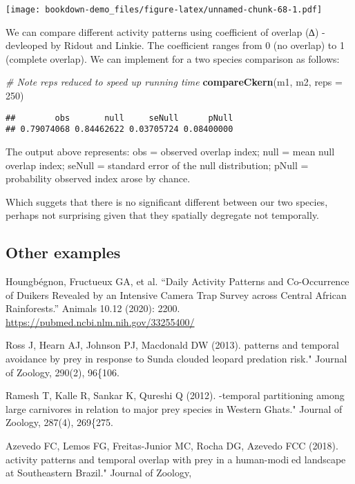\documentclass[]{book}
\newenvironment{Shaded}{\begin{snugshade}}{\end{snugshade}}
\newcommand{\KeywordTok}[1]{\textcolor[rgb]{0.13,0.29,0.53}{\textbf{#1}}}
\newcommand{\DataTypeTok}[1]{\textcolor[rgb]{0.13,0.29,0.53}{#1}}
\newcommand{\DecValTok}[1]{\textcolor[rgb]{0.00,0.00,0.81}{#1}}
\newcommand{\CommentTok}[1]{\textcolor[rgb]{0.56,0.35,0.01}{\textit{#1}}}
\newcommand{\NormalTok}[1]{#1}
\begin{document}
\texttt{[image: bookdown-demo\_files/figure-latex/unnamed-chunk-68-1.pdf]}

We can compare different activity patterns using coefficient of overlap
(∆) - devleoped by Ridout and Linkie. The coefficient ranges from 0 (no
overlap) to 1 (complete overlap). We can implement for a two species
comparison as follows:

\begin{Shaded}
\begin{Highlighting}[]
\CommentTok{# Note reps reduced to speed up running time}
\KeywordTok{compareCkern}\NormalTok{(m1, m2, }\DataTypeTok{reps =} \DecValTok{250}\NormalTok{)}
\end{Highlighting}
\end{Shaded}

\begin{verbatim}
##        obs       null     seNull      pNull 
## 0.79074068 0.84462622 0.03705724 0.08400000
\end{verbatim}

The output above represents: obs = observed overlap index; null = mean
null overlap index; seNull = standard error of the null distribution;
pNull = probability observed index arose by chance.

Which suggets that there is no significant different between our two
species, perhaps not surprising given that they spatially degregate not
temporally.

\subsection{Other examples}\label{other-examples}

Houngbégnon, Fructueux GA, et al. ``Daily Activity Patterns and
Co-Occurrence of Duikers Revealed by an Intensive Camera Trap Survey
across Central African Rainforests.'' Animals 10.12 (2020): 2200.
\url{https://pubmed.ncbi.nlm.nih.gov/33255400/}

Ross J, Hearn AJ, Johnson PJ, Macdonald DW (2013). \Activity patterns
and temporal avoidance by prey in response to Sunda clouded leopard
predation risk." Journal of Zoology, 290(2), 96\{106.

Ramesh T, Kalle R, Sankar K, Qureshi Q (2012). \Spatio-temporal
partitioning among large carnivores in relation to major prey species in
Western Ghats." Journal of Zoology, 287(4), 269\{275.

Azevedo FC, Lemos FG, Freitas-Junior MC, Rocha DG, Azevedo FCC (2018).
\Puma activity patterns and temporal overlap with prey in a
human-modied landscape at Southeastern Brazil." Journal of Zoology,
\end{document}
